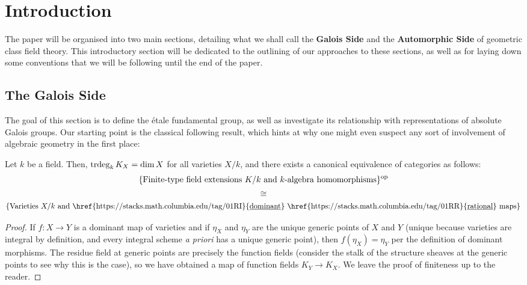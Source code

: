 \section{Introduction}
    The paper will be organised into two main sections, detailing what we shall call the \textbf{Galois Side} and the \textbf{Automorphic Side} of geometric class field theory. This introductory section will be dedicated to the outlining of our approaches to these sections, as well as for laying down some conventions that we will be following until the end of the paper.

    \subsection{The Galois Side}
        The goal of this section is to define the \'etale fundamental group, as well as investigate its relationship with representations of absolute Galois groups. Our starting point is the classical following result, which hints at why one might even suspect any sort of involvement of algebraic geometry in the first place:
        \begin{lemma} \label{lemma: varieties_and_field_extensions}
            \cite[\href{https://stacks.math.columbia.edu/tag/0BXN}{Tag 0BXN}]{stacks} Let $k$ be a field. Then, $\operatorname{trdeg}_k K_X = \dim X$ for all varieties $X/k$, and there exists a canonical equivalence of categories as follows:
                $$\{\text{Finite-type field extensions $K/k$ and $k$-algebra homomorphisms}\}^{\mathrm{op}}$$
                $$\cong$$
                $$\{\text{Varieties $X/k$ and \href{https://stacks.math.columbia.edu/tag/01RI}{\underline{dominant}} \href{https://stacks.math.columbia.edu/tag/01RR}{\underline{rational}} maps}\}$$
        \end{lemma}
            \begin{proof}
                If $f: X \to Y$ is a dominant map of varieties and if $\eta_X$ and $\eta_Y$ are the unique generic points of $X$ and $Y$ (unique because varieties are integral by definition, and every integral scheme \textit{a priori} has a unique generic point), then $f(\eta_X) = \eta_Y$ per the definition of dominant morphisms. The residue field at generic points are precisely the function fields (consider the stalk of the structure sheaves at the generic points to see why this is the case), so we have obtained a map of function fields $K_Y \to K_X$. We leave the proof of finiteness up to the reader.
            \end{proof}
